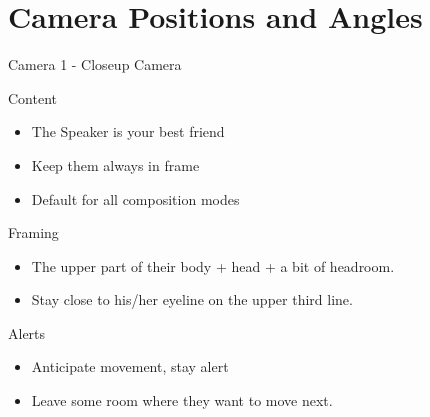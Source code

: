 \documentclass[aspectratio=169]{beamer}
\begin{document}
\section{Camera Positions and Angles}



\begin{frame}{Camera 1 - Closeup Camera}
		\begin{block}{Content}
			\begin{itemize}
				\item The Speaker is your best friend
				\item Keep them always in frame
				\item Default for all composition modes
			\end{itemize}
		\end{block}
		
		\begin{block}{Framing}
			\begin{itemize}
				\item The upper part of their body + head + a bit of headroom.
				\item Stay close to his/her eyeline on the upper third line.
			\end{itemize}
		\end{block}

		\begin{alertblock}{Alerts}
			\begin{itemize}
				\item Anticipate movement, stay alert
				\item Leave some room where they want to move next.
			\end{itemize}
		\end{alertblock}
\end{frame}
\end{document}

